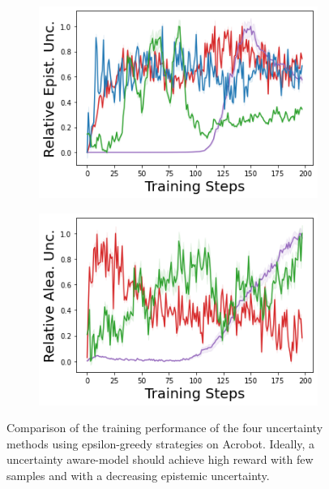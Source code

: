 \begin{figure}
\begin{subfigure}{.245\textwidth}
    \end{subfigure}
    \begin{subfigure}{.245\textwidth}
        \includegraphics[width=\textwidth]{sections/011_icml2022/resources/acrobot-training_epistemic_uncertainty-training-model.png}
    \end{subfigure}
    \begin{subfigure}{.245\textwidth}
        \includegraphics[width=\textwidth]{sections/011_icml2022/resources/acrobot-training_aleatoric_ucertainty-training-model.png}  
    \end{subfigure}
    \caption{Comparison of the training performance of the four uncertainty methods using epsilon-greedy strategies on Acrobot. Ideally, a uncertainty aware-model should achieve high reward with few samples and with a decreasing epistemic uncertainty.}
    \label{fig:model-training-performance-acrobot}
\end{figure}